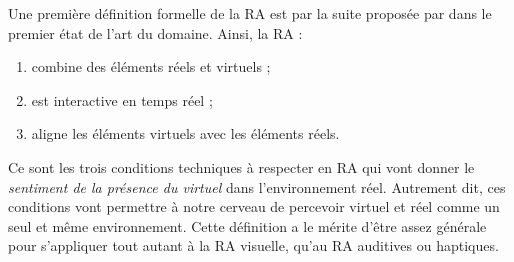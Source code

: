 
Une première définition formelle de la RA est par la suite proposée par \cite{Azuma1997} dans le premier état de l'art du domaine. Ainsi, la RA :
\begin{enumerate}
  \item combine des éléments réels et virtuels ;
  \item est interactive en temps réel ;
  \item aligne les éléments virtuels avec les éléments réels.
\end{enumerate}
\medskip

Ce sont les trois conditions techniques à respecter en RA qui vont donner le \emph{sentiment de la présence du virtuel} dans l'environnement réel. Autrement dit, ces conditions vont permettre à notre cerveau de percevoir virtuel et réel comme un seul et même environnement. Cette définition a le mérite d'être assez générale pour s'appliquer tout autant à la RA visuelle, qu'au RA auditives ou haptiques.


